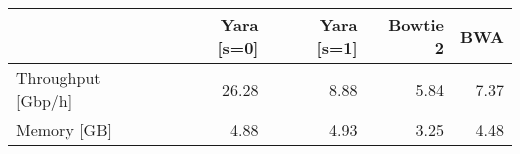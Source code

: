 \begin{tabular}{lrrrr}
  \toprule
 & Yara [s=0] & Yara [s=1] & Bowtie 2 & BWA \\ 
  \midrule
Throughput [Gbp/h] & 26.28 & 8.88 & 5.84 & 7.37 \\ 
  Memory [GB] & 4.88 & 4.93 & 3.25 & 4.48 \\ 
   \bottomrule
\end{tabular}
